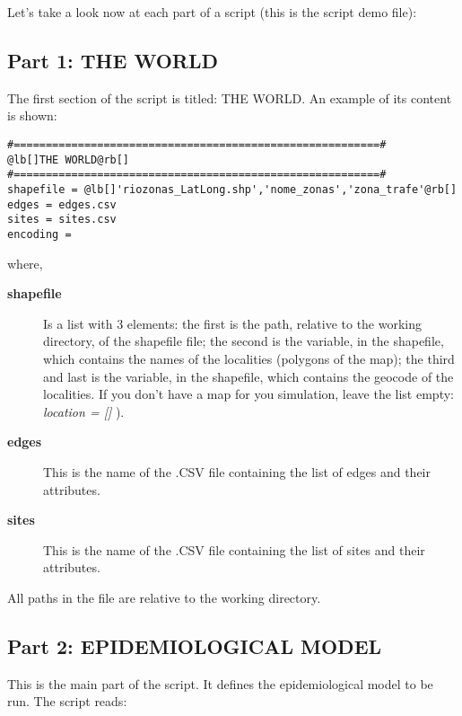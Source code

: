 \documentclass[a4paper,10pt]{manual}
\begin{document}
Let's take a look now at each part of a script (this is the script   demo file):


\subsection{Part 1: THE WORLD}

The first section of the script is titled: THE WORLD. An example of its content is shown:

\begin{Verbatim}[commandchars=@\[\]]
#=========================================================#
@lb[]THE WORLD@rb[]
#=========================================================#
shapefile = @lb[]'riozonas_LatLong.shp','nome_zonas','zona_trafe'@rb[]
edges = edges.csv
sites = sites.csv
encoding =
\end{Verbatim}

where,
\begin{description}
\item[\textbf{shapefile}]
Is a list with 3 elements: the first is  the path, relative to the working directory, of the shapefile file; the second  is the variable, in the shapefile, which contains the names of the localities (polygons of the map); the third and last is the variable, in the shapefile, which contains the geocode of the localities. If you don't have a map for you simulation, leave the list empty: \emph{location = {[}{]}} ).

\item[\textbf{edges}]
This is the name of the .CSV file containing the list of edges and their attributes.

\item[\textbf{sites}]
This is the name of the .CSV file containing the list of sites and their attributes.

\end{description}

\begin{notice}[note]
All paths in the  file are relative to the working directory.
\end{notice}


\subsection{Part 2: EPIDEMIOLOGICAL MODEL}

This is the main part of the script. It defines the epidemiological model to be run.
The script reads:
\end{document}
